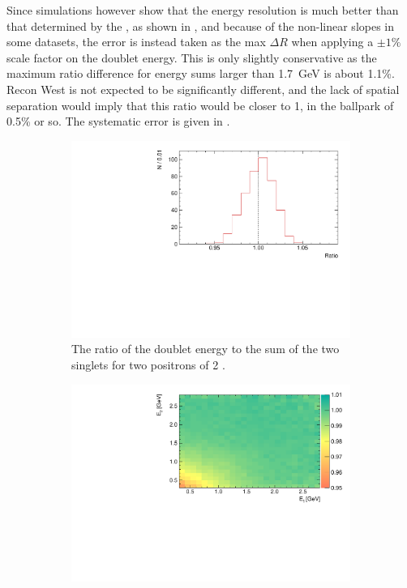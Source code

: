 Since simulations however show that the energy resolution is much better than that determined by the \chisq, as shown in , and because of the non-linear slopes in some datasets, the error is instead taken as the max $\Delta R$ when applying a $\pm1\%$ scale factor on the doublet energy. This is only slightly conservative as the maximum ratio difference for energy sums larger than \SI{1.7}{\GeV} is about 1.1\%. Recon West is not expected to be significantly different, and the lack of spatial separation would imply that this ratio would be closer to 1, in the ballpark of 0.5\% or so. The systematic error is given in .


\begin{figure}
\centering
    \begin{subfigure}[t]{0.45\textwidth}
        \centering
        \includegraphics[width=\textwidth]{p_ratio_2_2_hist}
        \caption{The ratio of the doublet energy to the sum of the two singlets for two positrons of 2 \GeV.}
    \end{subfigure}%
    \hspace{1cm}
    \begin{subfigure}[t]{0.45\textwidth}
        \centering
        \includegraphics[width=\textwidth]{p_ratio_e1_e2}

\end{subfigure}
\end{figure}
